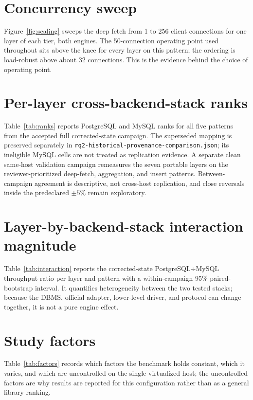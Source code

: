 \documentclass[11pt,a4paper]{article}
\newcommand{\tabledir}{tables/}
\begin{document}


\section{Concurrency sweep}
\label{sup:scaling}
Figure~\ref{fig:scaling} sweeps the deep fetch from 1 to 256 client
connections for one layer of each tier, both engines. The 50-connection
operating point used throughout sits above the knee for every layer on this
pattern; the ordering is load-robust above about 32 connections. This is the evidence behind the choice of
operating point.



\section{Per-layer cross-backend-stack ranks}
\label{sup:ranks}
Table~\ref{tab:ranks} reports PostgreSQL and MySQL ranks for all five patterns from the accepted full corrected-state campaign. The superseded mapping is preserved separately in \texttt{rq2-historical-provenance-comparison.json}; its ineligible MySQL cells are not treated as replication evidence. A separate clean same-host validation campaign remeasures the seven portable layers on the reviewer-prioritized deep-fetch, aggregation, and insert patterns. Between-campaign agreement is descriptive, not cross-host replication, and close reversals inside the predeclared \(\pm5\%\) remain exploratory.



\section{Layer-by-backend-stack interaction magnitude}
\label{sup:interaction}
Table~\ref{tab:interaction} reports the corrected-state PostgreSQL$\div$MySQL throughput ratio per layer and pattern with a within-campaign 95\% paired-bootstrap interval. It quantifies heterogeneity between the two tested stacks; because the DBMS, official adapter, lower-level driver, and protocol can change together, it is not a pure engine effect.



\section{Study factors}
\label{sup:factors}
Table~\ref{tab:factors} records which factors the benchmark holds constant, which
it varies, and which are uncontrolled on the single virtualized host; the
uncontrolled factors are why results are reported for this configuration rather
than as a general library ranking.

\end{document}
